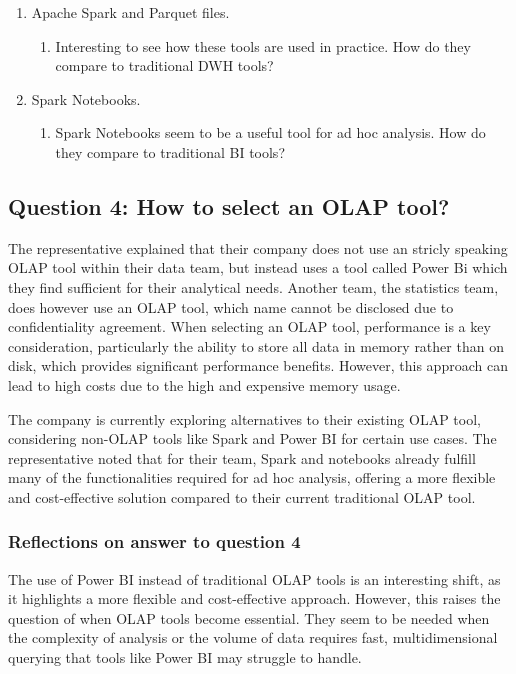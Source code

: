 \begin{enumerate}
    \item Apache Spark and Parquet files.
    \begin{enumerate}
        \item Interesting to see how these tools are used in practice. How do they compare to traditional DWH tools?
    \end{enumerate}
    \item Spark Notebooks.
    \begin{enumerate}
        \item Spark Notebooks seem to be a useful tool for ad hoc analysis. How do they compare to traditional BI tools?
    \end{enumerate}
\end{enumerate}
\subsection{Question 4: How to select an OLAP tool?}

The representative explained that their company does not use an stricly speaking OLAP tool within their data team, but instead uses a tool called Power Bi which they find sufficient for their analytical needs. 
Another team, the statistics team, does however use an OLAP tool, which name cannot be disclosed due to confidentiality agreement. 
When selecting an OLAP tool, performance is a key consideration, particularly the ability to store all data in memory rather than on disk, which 
provides significant performance benefits. However, this approach can lead to high costs due to the high and expensive memory usage.

The company is currently exploring alternatives to their existing OLAP tool, considering non-OLAP tools like Spark and Power BI for certain use cases. 
The representative noted that for their team, Spark and notebooks already fulfill many of the functionalities required for ad hoc analysis, 
offering a more flexible and cost-effective solution compared to their current traditional OLAP tool.

\subsubsection{Reflections on answer to question 4}

The use of Power BI instead of traditional OLAP tools is an interesting shift, as it highlights a more flexible and cost-effective approach. 
However, this raises the question of when OLAP tools become essential. They seem to be needed when the complexity of analysis or the volume 
of data requires fast, multidimensional querying that tools like Power BI may struggle to handle.

